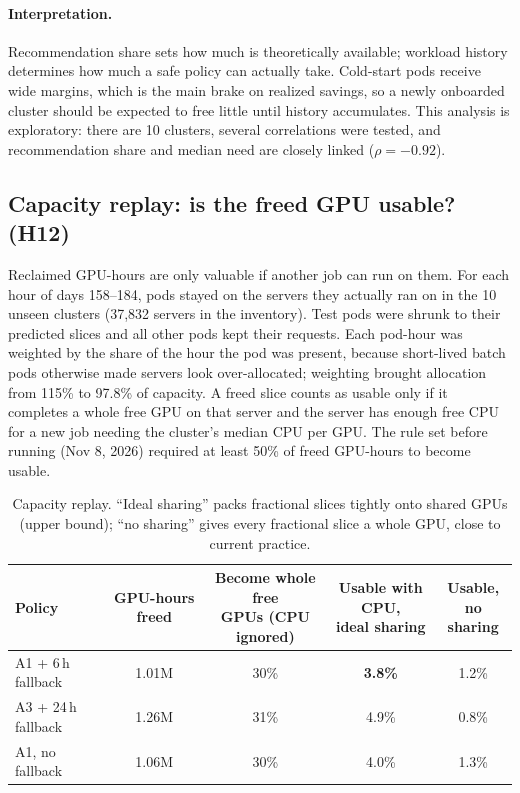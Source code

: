 \paragraph{Interpretation.} Recommendation share sets how much is theoretically available; workload history determines how much a safe policy can actually take. Cold-start pods receive wide margins, which is the main brake on realized savings, so a newly onboarded cluster should be expected to free little until history accumulates. This analysis is exploratory: there are 10 clusters, several correlations were tested, and recommendation share and median need are closely linked ($\rho = -0.92$).

\subsection{Capacity replay: is the freed GPU usable? (H12)}
\label{sec:capacity}

Reclaimed GPU-hours are only valuable if another job can run on them. For each hour of days 158--184, pods stayed on the servers they actually ran on in the 10 unseen clusters (37{,}832 servers in the inventory). Test pods were shrunk to their predicted slices and all other pods kept their requests. Each pod-hour was weighted by the share of the hour the pod was present, because short-lived batch pods otherwise made servers look over-allocated; weighting brought allocation from 115\% to 97.8\% of capacity. A freed slice counts as usable only if it completes a whole free GPU on that server and the server has enough free CPU for a new job needing the cluster's median CPU per GPU. The rule set before running (Nov 8, 2026) required at least 50\% of freed GPU-hours to become usable.

\begin{table}[H]
\centering\small
\caption{Capacity replay. ``Ideal sharing'' packs fractional slices tightly onto shared GPUs (upper bound); ``no sharing'' gives every fractional slice a whole GPU, close to current practice.}
\label{tab:capacity}
\begin{tabular}{@{}lcccc@{}}
\toprule
Policy & GPU-hours freed & \makecell{Become whole free\\GPUs (CPU ignored)} & \makecell{Usable with CPU,\\ideal sharing} & \makecell{Usable,\\no sharing} \\
\midrule
A1 + 6\,h fallback & 1.01M & 30\% & \textbf{3.8\%} & 1.2\% \\
A3 + 24\,h fallback & 1.26M & 31\% & 4.9\% & 0.8\% \\
A1, no fallback & 1.06M & 30\% & 4.0\% & 1.3\% \\
\bottomrule
\end{tabular}
\end{table}


